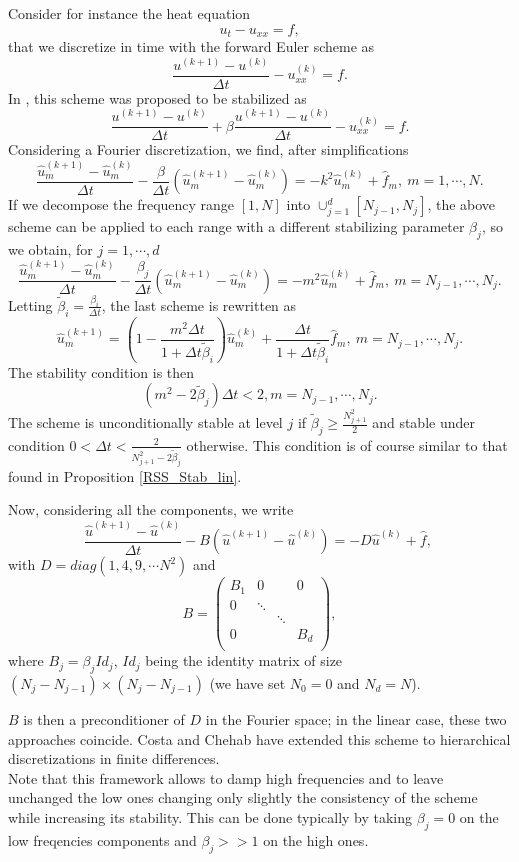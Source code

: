 \documentclass[11pt]{article}
\newcommand{\Frac}[2] {\frac{\textstyle #1} {\textstyle #2}}
\begin{document}
{Consider for instance  the heat equation
$$
u_t-u_{xx}=f,
$$
that we discretize in time with the forward Euler scheme as
$$
\Frac{u^{(k+1)}-u^{(k)}}{\Delta t} -u^{(k)}_{xx}=f.
$$
In \cite{BCostaPHD,CDGT},  this scheme was proposed to be stabilized as
$$
\Frac{u^{(k+1)}-u^{(k)}}{\Delta t} +\beta
\Frac{u^{(k+1)}-u^{(k)}}{\Delta t} -u^{(k)}_{xx}=f.
$$
Considering a Fourier discretization, we find, after simplifications
$$
\Frac{{\hat u}^{(k+1)}_m-{\hat u}_m^{(k)}}{\Delta t} -\Frac{\beta}{\Delta t}({\hat u}_m^{(k+1)}-{\hat u}_m^{(k)})
=-k^2{\hat u}^{(k)}_m + {\hat f}_m, \ m=1,\cdots, N.
$$
If we decompose the frequency range $[1,N]$ into $\displaystyle{\cup_{j=1}^{d}[N_{j-1},N_{j}]}$, the above scheme can be applied 
to each range with a different stabilizing parameter $\beta_j$, so we obtain, for $j=1,\cdots,d$
$$
\Frac{{\hat u}^{(k+1)}_m-{\hat u}^{(k)}_m}{\Delta t} -\Frac{\beta_j}{\Delta t}({\hat u}^{(k+1)}_m-{\hat u}^{(k)}_m)
=-m^2{\hat u}^{(k)}_m + {\hat f}_m, \ m=N_{j-1}, \cdots, N_{j}.
$$
Letting ${\tilde \beta}_i=\Frac{\beta_i}{\Delta t}$, the last scheme is rewritten as
$$
{\hat u}^{(k+1)}_m=\left(1-\Frac{m^2\Delta t}{1+\Delta t {\tilde \beta_i}}\right){\hat u}^{(k)}_m
+\Frac{\Delta t}{1+\Delta t {\tilde \beta_i}}{\hat f}_m, \ m=N_{j-1}, \cdots, N_{j}.
$$
The stability condition is then
$$
(m^2-2{\tilde \beta}_j)\Delta t < 2, m=N_{j-1}, \cdots, N_{j}.
$$
The scheme is unconditionally stable at level $j$ if ${\tilde \beta}_j\ge \Frac{N^2_{j+1}}{2}$ and stable under condition $0<\Delta t <\Frac{2}{N^2_{j+1}-2{\tilde \beta}_j}$ otherwise. This condition is of course similar to that found in Proposition \ref{RSS_Stab_lin}.

Now, considering all the components, we write
$$
\Frac{{\hat u}^{(k+1)}-{\hat u}^{(k)}}{\Delta t} -B({\hat u}^{(k+1)}-{\hat u}^{(k)})
=-D{\hat u}^{(k)} + {\hat f}, \
$$
with $D=diag(1,4,9, \cdots N^2)$ and 
$$
B=
\left(
\begin{array}{llll}
B_1 & 0 & & 0\\
0 & \ddots &  & \\
 & & \ddots &   \\
 0 & &  & B_d\\
\end{array}
\right),
$$
where $B_j=\beta_j Id_j$, $Id_j$ being the identity matrix of size $(N_{j}-N_{j-1}) \times (N_{j}- N_{j-1})$ (we have set $N_0=0$ and $N_d=N$).

$B$ is then a preconditioner of $D$ in the Fourier space; in the linear case, these two approaches coincide.
Costa and Chehab \cite{ChehabCosta1,ChehabCosta2} have
extended this scheme to hierarchical discretizations in finite
differences.\\
Note that this framework allows to damp high frequencies and to leave unchanged the low ones changing only slightly the consistency of the scheme while increasing its stability. This can be done typically by taking $\beta_j=0$ on the low freqencies components and $\beta_j >>1$ on the high ones.

}
\end{document}
